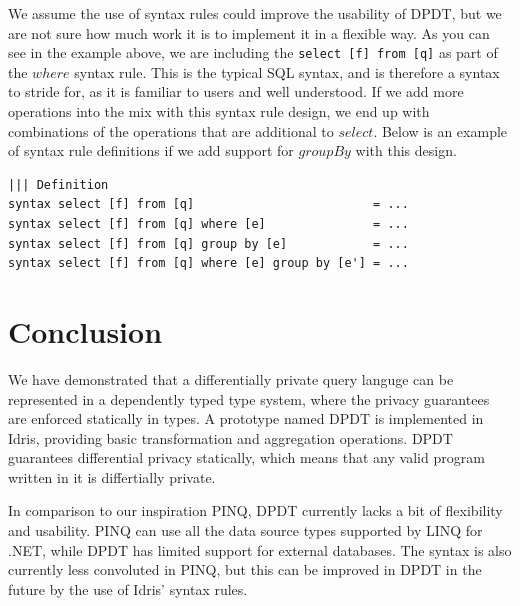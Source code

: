 \documentclass[12pt]{article}
\begin{document}
We assume the use of syntax rules could improve the usability of DPDT, but we are not sure how much work it is to implement it in a flexible way. 
As you can see in the example above, we are including the \texttt{select [f] from [q]} as part of the $where$ syntax rule.
This is the typical SQL syntax, and is therefore a syntax to stride for, as it is familiar to users and well understood.
If we add more operations into the mix with this syntax rule design, we end up with combinations of the operations that are additional to $select$.
Below is an example of syntax rule definitions if we add support for $groupBy$ with this design.

\begin{lstlisting}
||| Definition
syntax select [f] from [q]                         = ...
syntax select [f] from [q] where [e]               = ...
syntax select [f] from [q] group by [e]            = ...
syntax select [f] from [q] where [e] group by [e'] = ...
\end{lstlisting}






\section{Conclusion}\label{sec:conclusion}

We have demonstrated that a differentially private query languge can be represented in a dependently typed type system, where the privacy guarantees are enforced statically in types.
A prototype named DPDT is implemented in Idris, providing basic transformation and aggregation operations.
DPDT guarantees differential privacy statically, which means that any valid program written in it is differtially private.

In comparison to our inspiration PINQ, DPDT currently lacks a bit of flexibility and usability.
PINQ can use all the data source types supported by LINQ for .NET, while DPDT has limited support for external databases.
The syntax is also currently less convoluted in PINQ, but this can be improved in DPDT in the future by the use of Idris' syntax rules.
\end{document}
